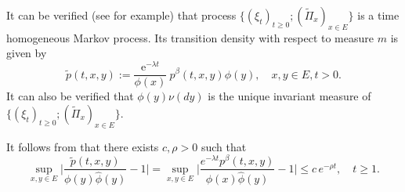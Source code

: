 \documentclass[12pt,a4paper]{amsart}
\numberwithin{equation}{section}
\theoremstyle{plain}
\theoremstyle{definition}
\theoremstyle{remark}
\begin{document}
	It can be verified (see \cite{KimSong2008Intrinsic} for example) that process $\{(\xi_t)_{t\geq 0}; (\widetilde\Pi_x)_{x\in E}\}$ is a time homogeneous Markov process.  Its transition density with respect to measure $m$ is given by
\begin{equation}
\label{eq: tilde p}
    \tilde p(t, x, y)
    :=\frac{\mbox{e}^{-\lambda t}}{\phi(x)}\ p^\beta(t, x, y)\phi(y),
    \quad x,y \in E,t>0.
\end{equation}
	It can also be verified that $\phi(y)\nu(dy)$ is the unique invariant measure of $\{(\xi_t)_{t\geq 0}; (\widetilde\Pi_x)_{x\in E}\}$.

	It follows from \cite[Theorem 2.7]{KimSong2008Intrinsic} that there exists $c, \rho > 0$ such that
\begin{equation}\label{IU}
	\sup_{x,y\in E}\Big|\frac{\tilde p(t,x,y)}{\phi(y) \hat\phi(y)}- 1\Big|
	=\sup_{x,y\in E}\Big|\frac{e^{-\lambda t}p^\beta(t,x,y)}{\phi(x) \hat\phi(y)}- 1\Big|
	\leq c\,e^{-\rho t},
	\quad t\geq 1.
\end{equation}
\end{document}
